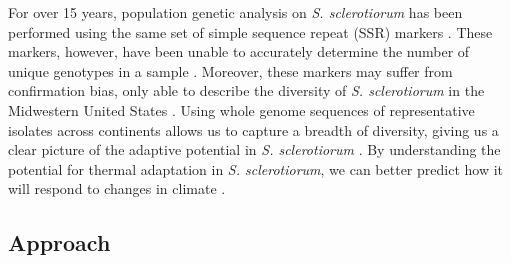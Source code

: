 \documentclass[12pt,letterpaper]{article}
\begin{document}
For over 15 years, population genetic analysis on \textit{S. sclerotiorum} has been performed using the same set of simple sequence repeat (SSR) markers \citep{sirjusingh2001characterization}. 
These markers, however, have been unable to accurately determine the number of unique genotypes in a sample \citep{lehner2017independently, lehner2017sclerotinia,arnaud2007standardizing}.
Moreover, these markers may suffer from confirmation bias, only able to describe the diversity of \textit{S. sclerotiorum} in the Midwestern United States \citep{attanayake2013sclerotinia}. 
Using whole genome sequences of representative isolates across continents allows us to capture a breadth of diversity, giving us a clear picture of the adaptive potential in \textit{S. sclerotiorum} \citep{grunwald2016population}.
By understanding the potential for thermal adaptation in \textit{S. sclerotiorum}, we can better predict how it will respond to changes in climate \citep{croll2016genetic}.




\subsection{Approach}



 
 
 
\end{document}
